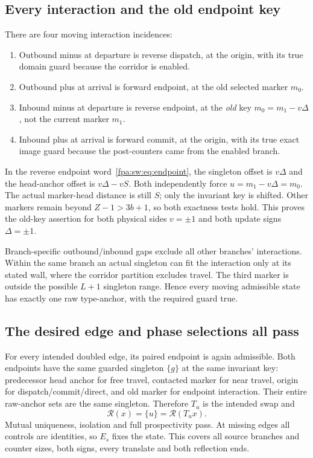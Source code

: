 \documentclass[11pt,a4paper]{article}
\numberwithin{equation}{section}
\newcommand{\Rec}{\mathcal R}\newcommand{\Sel}{\mathcal S}
\newcommand{\Es}{E_s}\newcommand{\Ps}{P_s}\newcommand{\Fs}{F_s}\newcommand{\Cand}{\mathcal C_P}
\begin{document}
\subsection{Every interaction and the old endpoint key}
There are four moving interaction incidences:
\begin{enumerate}
\item Outbound minus at departure is reverse dispatch, at the origin, with its true domain guard because the corridor is enabled.
\item Outbound plus at arrival is forward endpoint, at the old selected marker $m_0$.
\item Inbound minus at departure is reverse endpoint, at the \emph{old} key $m_0=m_1-v\Delta$, not the current marker $m_1$.
\item Inbound plus at arrival is forward commit, at the origin, with its true exact image guard because the post-counters came from the enabled branch.
\end{enumerate}
In the reverse endpoint word~\eqref{fpa:sw:eq:endpoint}, the singleton offset is $v\Delta$ and the head-anchor offset is $v\Delta-vS$. Both independently force $u=m_1-v\Delta=m_0$. The actual marker-head distance is still $S$; only the invariant key is shifted. Other markers remain beyond $Z-1>3b+1$, so both exactness tests hold. This proves the old-key assertion for both physical sides $v=\pm1$ and both update signs $\Delta=\pm1$.

Branch-specific outbound/inbound gaps exclude all other branches' interactions. Within the same branch an actual singleton can fit the interaction only at its stated wall, where the corridor partition excludes travel. The third marker is outside the possible $L+1$ singleton range. Hence every moving admissible state has exactly one raw type-anchor, with the required guard true.

\subsection{The desired edge and phase selections all pass}
For every intended doubled edge, its paired endpoint is again admissible. Both endpoints have the same guarded singleton $\{g\}$ at the same invariant key: predecessor head anchor for free travel, contacted marker for near travel, origin for dispatch/commit/direct, and old marker for endpoint interaction. Their entire raw-anchor sets are the same singleton. Therefore $T_u$ is the intended swap and
\[
\Rec(x)=\{u\}=\Rec(T_ux).
\]
Mutual uniqueness, isolation and full prospectivity pass. At missing edges all controls are identities, so $\Es$ fixes the state. This covers all source branches and counter sizes, both signs, every translate and both reflection ends.
\end{document}
